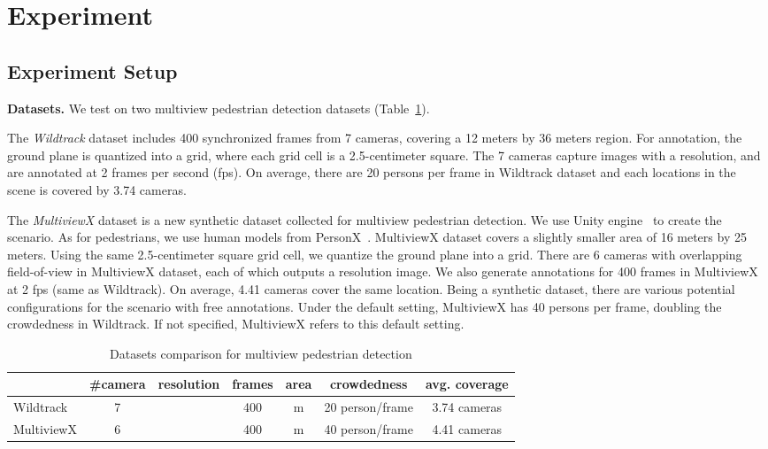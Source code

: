 \documentclass[runningheads]{llncs}
\begin{document}
\section{Experiment}
\label{sec:experiment}

\subsection{Experiment Setup}
\label{sec:sec:datasets}

\textbf{Datasets.} We test on two multiview pedestrian detection datasets (Table~\ref{tab:datasets}). 

The \textit{Wildtrack} dataset includes 400 synchronized frames from 7 cameras, covering a 12 meters by 36 meters region. For annotation, the ground plane is quantized into a  grid, where each grid cell is a 2.5-centimeter square. The 7 cameras capture images with a  resolution, and are annotated at 2 frames per second (fps). On average, there are 20 persons per frame in Wildtrack dataset and each locations in the scene is covered by 3.74 cameras.

The \textit{MultiviewX} dataset is a new synthetic dataset collected for multiview pedestrian detection. 
We use Unity engine~\cite{unity} to create the scenario. As for pedestrians, we use human models from PersonX~\cite{sun2019dissecting}. MultiviewX dataset covers a slightly smaller area of 16 meters by 25 meters. Using the same 2.5-centimeter square grid cell, we quantize the ground plane into a  grid. There are 6 cameras with overlapping field-of-view in MultiviewX dataset, each of which outputs a  resolution image. We also generate annotations for 400 frames in MultiviewX at 2 fps (same as Wildtrack). On average, 4.41 cameras cover the same location. 
Being a synthetic dataset, there are various potential configurations for the scenario with free annotations. 
Under the default setting, MultiviewX has 40 persons per frame, doubling the crowdedness in Wildtrack. 
If not specified, MultiviewX refers to this default setting. 



\begin{table}[t]
\centering
\caption{Datasets comparison for multiview pedestrian detection}
\begin{tabular}{l|c|c|c|c|c|c}
\toprule
\multicolumn{1}{c|}{} & \#camera & resolution & frames & area  & crowdedness & avg. coverage\\ \hline
Wildtrack  & 7                             &                     & 400                         &  m                                    & 20 person/frame  & 3.74 cameras                          \\ \hline
MultiviewX & 6                             &                        & 400                         &  m                                  & 40 person/frame  & 4.41 cameras                           \\ 
\bottomrule
\end{tabular}
\label{tab:datasets}
\end{table}
\end{document}
